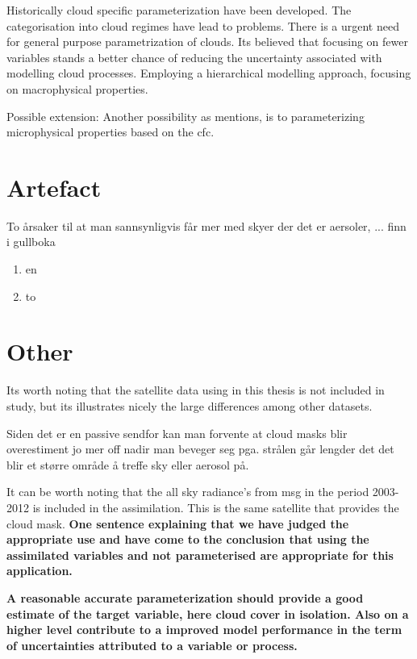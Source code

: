 Historically cloud specific parameterization have been developed. The categorisation into cloud regimes have lead to problems. There is a urgent need for general purpose parametrization of clouds. Its believed that focusing on fewer variables stands a better chance of reducing the uncertainty associated with modelling cloud processes. Employing a hierarchical modelling approach, focusing on macrophysical properties.

Possible extension: Another possibility as \cite{Fowler1996LiquidAssumptions} mentions, is to parameterizing microphysical properties based on the \acrshort{cfc}.

\section{Artefact}
To årsaker til at man sannsynligvis får mer med skyer der det er aersoler,  ... finn i gullboka
\begin{enumerate}
    \item en
    \item to
\end{enumerate}


\section{Other}
Its worth noting that the satellite data using in this thesis is not included in  \citeauthor{Stubenrauch2013AssessmentPanel} study, but its illustrates nicely the large differences among other datasets. 


Siden det er en passive sendfor kan man forvente at cloud masks blir overestiment jo mer off nadir man beveger seg pga. strålen går lengder det det blir et større område å treffe sky eller aerosol på. \citeauthor{Maddux2010ViewingProducts}


It can be worth noting that the all sky radiance's from \acrfull{msg} in the period 2003-2012 is included in the assimilation. This is the same satellite that provides the cloud mask. 
\textbf{One sentence explaining that we have judged the appropriate use and have come to the conclusion that using the assimilated variables and not parameterised are appropriate for this application.}


\textbf{A reasonable accurate parameterization should provide a good estimate of the target variable, here cloud cover in isolation. Also on a higher level contribute to a improved model performance in the term of uncertainties attributed to a variable or process.}  

